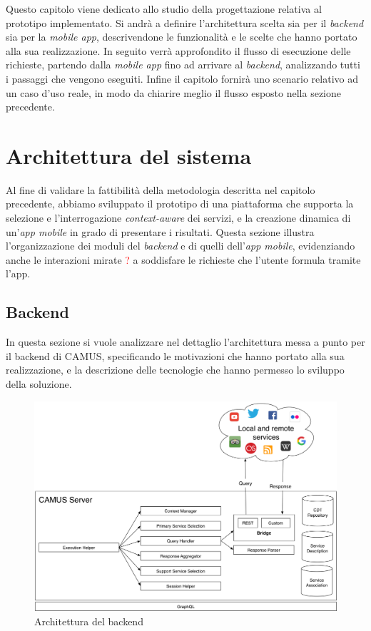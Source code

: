 Questo capitolo viene dedicato allo studio della progettazione relativa al prototipo implementato. Si andrà a definire l'architettura scelta sia per il \emph{backend} sia per la \emph{mobile app}, descrivendone le funzionalità e le scelte che hanno portato alla sua realizzazione. In seguito verrà approfondito il flusso di esecuzione delle richieste, partendo dalla \emph{mobile app} fino ad arrivare al \emph{backend}, analizzando tutti i passaggi che vengono eseguiti. Infine il capitolo fornirà uno scenario relativo ad un caso d'uso reale, in modo da chiarire meglio il flusso esposto nella sezione precedente.

\section{Architettura del sistema}

Al fine di validare la fattibilità della metodologia descritta nel capitolo precedente, abbiamo sviluppato il prototipo di una piattaforma che supporta la selezione e l'interrogazione \emph{context-aware} dei servizi, e la creazione dinamica di un'\textit{app mobile} in grado di presentare i risultati. Questa sezione illustra l'organizzazione dei moduli del \emph{backend} e di quelli dell'\emph{app mobile}, evidenziando anche le interazioni mirate \textcolor{red}{?} a soddisfare le richieste che l'utente formula tramite l'app.

\subsection{Backend\label{sec:architettura-backend}}

In questa sezione si vuole analizzare nel dettaglio l'architettura messa a punto per il backend di CAMUS, specificando le motivazioni che hanno portato alla sua realizzazione, e la descrizione delle tecnologie che hanno permesso lo sviluppo della soluzione.

\begin{figure}[ht]
	\centering
	\includegraphics[width=\textwidth]{4-progettazione-alto-livello/Immagini/camus-architecture-backend.png}
	\caption{Architettura del backend}\label{fig:architettura-backend}
\end{figure}

